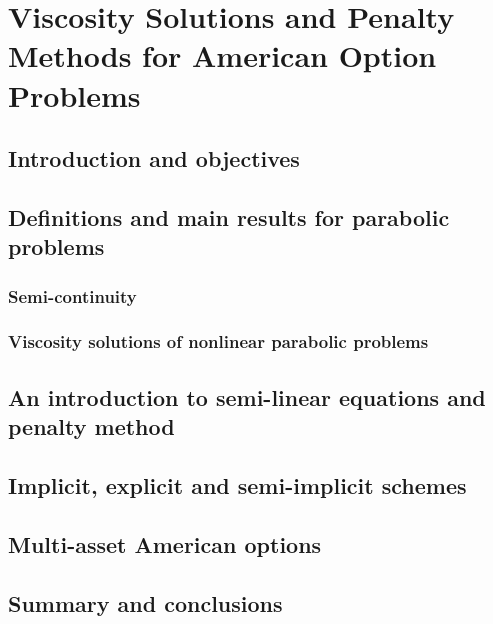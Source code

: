 \chapter{Viscosity Solutions and Penalty Methods for American Option Problems}

\section{Introduction and objectives}

\section{Definitions and main results for parabolic problems}

\subsection{Semi-continuity}

\subsection{Viscosity solutions of nonlinear parabolic problems}

\section{An introduction to semi-linear equations and penalty method}

\section{Implicit, explicit and semi-implicit schemes}

\section{Multi-asset American options}

\section{Summary and conclusions}